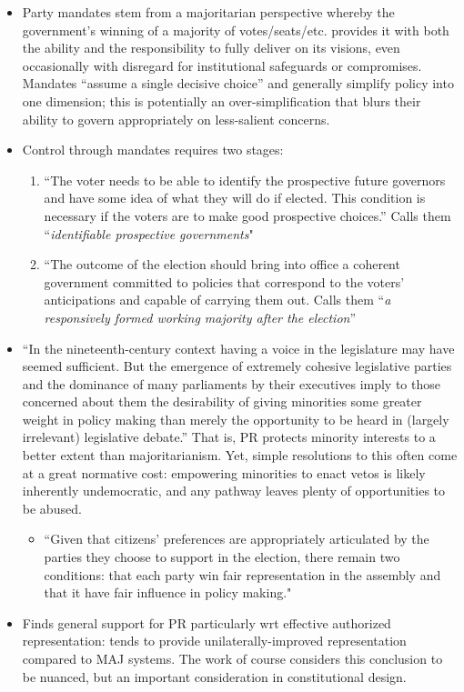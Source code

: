 \documentclass[12pt]{article}
\begin{document}
\begin{itemize}[leftmargin=*, itemsep=4pt]
    \item Party mandates stem from a majoritarian perspective whereby the government's winning of a majority of votes/seats/etc. provides it with both the ability and the responsibility to fully deliver on its visions, even occasionally with disregard for institutional safeguards or compromises. Mandates ``assume a single decisive choice'' and generally simplify policy into one dimension; this is potentially an over-simplification that blurs their ability to govern appropriately on less-salient concerns.
    \item Control through mandates requires two stages:
    \begin{enumerate}
        \item ``The voter needs to be able to identify the prospective future governors and have some idea of what they will do if elected. This condition is necessary if the voters are to make good prospective choices.'' Calls them ``\emph{identifiable prospective governments}"
        \item ``The outcome of the election should bring into office a coherent government committed to policies that correspond to the voters' anticipations and capable of carrying them out. Calls them ``\emph{a responsively formed working majority after the election}''
    \end{enumerate}
    \item ``In the nineteenth-century context having a voice in the legislature may have seemed sufficient. But the emergence of extremely cohesive legislative parties and the dominance of many parliaments by their executives imply to those concerned about them the desirability of giving minorities some greater weight in policy making than merely the opportunity to be heard in (largely irrelevant) legislative debate.'' That is, PR protects minority interests to a better extent than majoritarianism. Yet, simple resolutions to this often come at a great normative cost: empowering minorities to enact vetos is likely inherently undemocratic, and any pathway leaves plenty of opportunities to be abused.
    \begin{itemize}
        \item ``Given that citizens' preferences are appropriately articulated by the parties they choose to support in the election, there remain two conditions: that each party win fair representation in the assembly and that it have fair influence in policy making."
    \end{itemize}
    \item Finds general support for PR particularly wrt effective authorized representation: tends to provide unilaterally-improved representation compared to MAJ systems. The work of course considers this conclusion to be nuanced, but an important consideration in constitutional design.

\end{itemize}
\end{document}
